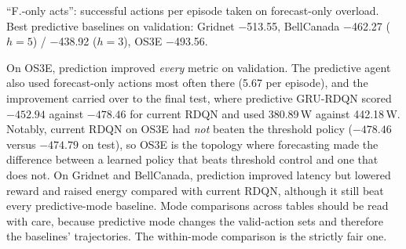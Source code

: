 \begin{table}[htbp]
\centering
\caption{Ablation on synthetic validation data: current RDQN versus predictive GRU-RDQN (horizons 5 and 3). Rewards in predictive mode are compared with the best predictive-mode baseline.}
\label{tab:ablation-mode}
\small
{}
\par\smallskip\footnotesize ``F.-only acts'': successful actions per episode taken on forecast-only overload. Best predictive baselines on validation: Gridnet $-$513.55, BellCanada $-$462.27 ($h=5$) / $-$438.92 ($h=3$), OS3E $-$493.56.
\end{table}

On OS3E, prediction improved \emph{every} metric on validation. The predictive agent also used forecast-only actions most often there (5.67 per episode), and the improvement carried over to the final test, where predictive GRU-RDQN scored $-452.94$ against $-478.46$ for current RDQN and used 380.89\,W against 442.18\,W. Notably, current RDQN on OS3E had \emph{not} beaten the threshold policy ($-478.46$ versus $-474.79$ on test), so OS3E is the topology where forecasting made the difference between a learned policy that beats threshold control and one that does not. On Gridnet and BellCanada, prediction improved latency but lowered reward and raised energy compared with current RDQN, although it still beat every predictive-mode baseline. Mode comparisons across tables should be read with care, because predictive mode changes the valid-action sets and therefore the baselines' trajectories. The within-mode comparison is the strictly fair one.

